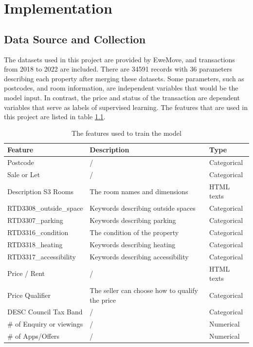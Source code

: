 \documentclass[12pt,twoside]{report}
\begin{document}
\chapter{Implementation}
\section{Data Source and Collection}
The datasets used in this project are provided by EweMove, and transactions from 2018 to 2022 are included. There are 34591 records with 36 parameters describing each property after merging these datasets. Some parameters, such as postcodes, and room information, are independent variables that would be the model input. In contrast, the price and status of the transaction are dependent variables that serve as labels of supervised learning. The features that are used in this project are listed in table \ref{model_input_features}. 

\begin{table}[!htbp]
	\centering
	\caption{The features used to train the model}
	\label{model_input_features}
	\begin{tabular}{| l | l | l |}
		\hline
		\textbf{Feature} & \textbf{Description} & \textbf{Type} \\
		\hline
		Postcode & / & Categorical \\
		\hline
		Sale or Let & / & Categorical \\
		\hline
		Description S3 Rooms & The room names and dimensions & HTML texts\\
		\hline
		RTD3308\_outside\_space & Keywords describing outside spaces & Categorical \\ 
		\hline
		RTD3307\_parking& Keywords describing parking & Categorical \\
		\hline
		RTD3316\_condition & The condition of the property & Categorical \\
		\hline
		RTD3318\_heating & Keywords describing heating & Categorical \\
		\hline
		RTD3317\_accessibility & Keywords describing accessibility & Categorical \\
		\hline
		Price / Rent & / & HTML texts \\
		\hline
		Price Qualifier & The seller can choose how to qualify the price & Categorical \\
		\hline
		DESC Council Tax Band & / & Categorical \\
		\hline
		\# of Enquiry or viewings & / & Numerical \\
		\hline
		\# of Apps/Offers & / & Numerical \\
		\hline
	\end{tabular}
\end{table}
\end{document}
